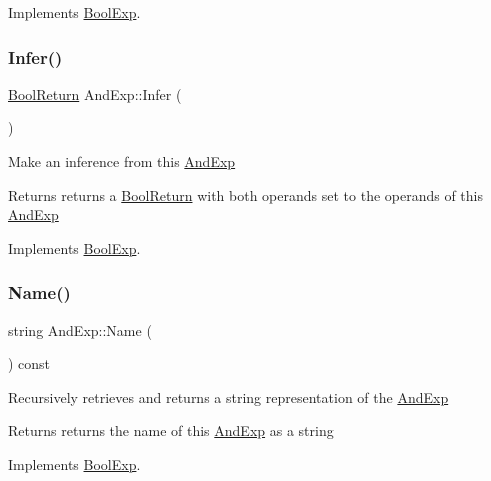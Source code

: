 Implements \mbox{\hyperlink{classBoolExp_a591fb5f9cb849e0f56e596406a9a10d0}{Bool\+Exp}}.

\mbox{\label{classAndExp_a26390e42318a13aa0f03a4e5ccbb0270}} 
\subsubsection{\texorpdfstring{Infer()}{Infer()}}
{\footnotesize\ttfamily \mbox{\hyperlink{structBoolReturn}{Bool\+Return}} And\+Exp\+::\+Infer (\begin{DoxyParamCaption}{ }\end{DoxyParamCaption})\hspace{0.3cm}{\ttfamily [virtual]}}

Make an inference from this \mbox{\hyperlink{classAndExp}{And\+Exp}} \begin{DoxyReturn}{Returns}
returns a \mbox{\hyperlink{structBoolReturn}{Bool\+Return}} with both operands set to the operands of this \mbox{\hyperlink{classAndExp}{And\+Exp}} 
\end{DoxyReturn}


Implements \mbox{\hyperlink{classBoolExp_a0e5d4a241332ae72d083645e4b71e0e6}{Bool\+Exp}}.

\mbox{\label{classAndExp_ac930ab2d9098904596aea6b2b6429d90}} 
\subsubsection{\texorpdfstring{Name()}{Name()}}
{\footnotesize\ttfamily string And\+Exp\+::\+Name (\begin{DoxyParamCaption}{ }\end{DoxyParamCaption}) const\hspace{0.3cm}{\ttfamily [virtual]}}

Recursively retrieves and returns a string representation of the \mbox{\hyperlink{classAndExp}{And\+Exp}} \begin{DoxyReturn}{Returns}
returns the name of this \mbox{\hyperlink{classAndExp}{And\+Exp}} as a string 
\end{DoxyReturn}


Implements \mbox{\hyperlink{classBoolExp_a3fdb64a9b8fd54e33d755ff4a577d11a}{Bool\+Exp}}.

\mbox{\label{classAndExp_ac6176c316c96da57f587fe7731fc414b}} 
